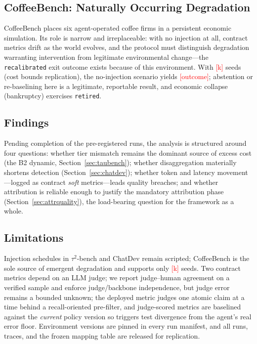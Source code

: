\documentclass[conference]{IEEEtran}
\newcommand{\ph}[1]{\textcolor{red}{[#1]}}
\newcommand{\code}[1]{\texttt{\small #1}}
\begin{document}
\subsection{CoffeeBench: Naturally Occurring Degradation}

CoffeeBench places six agent-operated coffee firms in a persistent economic
simulation. Its role is narrow and irreplaceable: with no injection at all,
contract metrics drift as the world evolves, and the protocol must distinguish
degradation warranting intervention from legitimate environmental change---the
\code{recalibrated} exit outcome exists because of this environment. With
\ph{k} seeds (cost bounds replication), the no-injection scenario yields
\ph{outcome}; abstention or re-baselining here is a legitimate, reportable
result, and economic collapse (bankruptcy) exercises \code{retired}.

\subsection{Findings}

Pending completion of the pre-registered runs, the analysis is structured
around four questions: whether tier mismatch remains the dominant source of
excess cost (the B2 dynamic, Section~\ref{sec:taubench}); whether
disaggregation materially shortens
detection (Section~\ref{sec:chatdev}); whether token and latency
movement---logged as contract \emph{soft} metrics---leads quality breaches; and
whether attribution is reliable enough to justify the mandatory attribution
phase (Section~\ref{sec:attrquality}), the load-bearing question for the
framework as a whole.

\subsection{Limitations}

Injection schedules in $\tau^2$-bench and ChatDev remain scripted; CoffeeBench
is the sole source of emergent degradation and supports only \ph{k} seeds. Two
contract metrics depend on an LLM judge; we report judge--human agreement on a
verified sample and enforce judge/backbone independence, but judge error
remains a bounded unknown; the deployed metric judges one atomic claim at a
time behind a recall-oriented pre-filter, and judge-scored metrics are
baselined against the \emph{current} policy version so triggers test divergence
from the agent's real error floor. Environment versions are pinned in every run
manifest, and all runs, traces, and the frozen mapping table are released for
replication.
\end{document}
